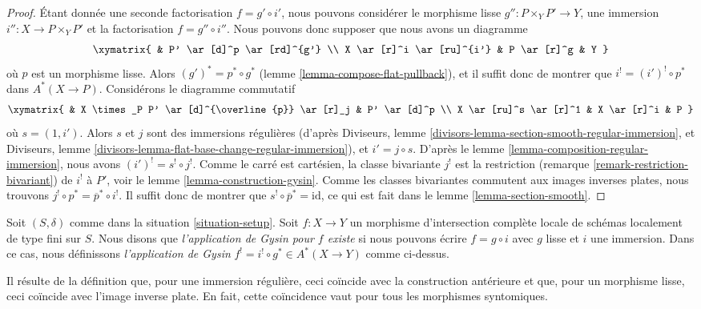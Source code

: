 \begin{proof}
Étant donnée une seconde factorisation $f = g' \circ i'$, nous pouvons
considérer le morphisme lisse $g'' : P \times_Y P' \to Y$, une
immersion $i'' : X \to P \times_Y P'$ et la factorisation
$f = g'' \circ i''$. Nous pouvons donc supposer que nous avons un diagramme
$$
\xymatrix{
& P' \ar[d]^p \ar[rd]^{g'} \\
X \ar[r]^i \ar[ru]^{i'} & P \ar[r]^g & Y
}
$$
où $p$ est un morphisme lisse. Alors $(g')^* = p^* \circ g^*$
(lemme \ref{lemma-compose-flat-pullback}), et il suffit donc
de montrer que $i^! = (i')^! \circ p^*$
dans $A^*(X \to P)$. Considérons le diagramme commutatif
$$
\xymatrix{
& X \times_P P' \ar[d]^{\overline{p}} \ar[r]_j & P' \ar[d]^p \\
X \ar[ru]^s \ar[r]^1 & X \ar[r]^i & P
}
$$
où $s =(1, i')$. Alors $s$ et $j$ sont des immersions régulières
(d'après Diviseurs, lemme \ref{divisors-lemma-section-smooth-regular-immersion},
et Diviseurs, lemme \ref{divisors-lemma-flat-base-change-regular-immersion}),
et $i' = j \circ s$. D'après le lemme \ref{lemma-composition-regular-immersion},
nous avons $(i')^! = s^! \circ j^!$.
Comme le carré est cartésien, la classe bivariante $j^!$
est la restriction (remarque \ref{remark-restriction-bivariant})
de $i^!$ à $P'$, voir le lemme \ref{lemma-construction-gysin}.
Comme les classes bivariantes commutent aux images inverses plates,
nous trouvons $j^! \circ p^* = \overline{p}^* \circ i^!$.
Il suffit donc de montrer que $s^! \circ \overline{p}^* = \text{id}$,
ce qui est fait dans le lemme \ref{lemma-section-smooth}.
\end{proof}

\begin{definition}
\label{definition-lci-gysin}
Soit $(S, \delta)$ comme dans la situation \ref{situation-setup}.
Soit $f : X \to Y$ un morphisme d'intersection complète locale
de schémas localement de type fini sur $S$. Nous disons que
{\it l'application de Gysin pour $f$ existe} si nous pouvons écrire
$f = g \circ i$ avec $g$ lisse et $i$ une immersion.
Dans ce cas, nous définissons
{\it l'application de Gysin} $f^! = i^! \circ g^* \in A^*(X \to Y)$ comme ci-dessus.
\end{definition}

\noindent
Il résulte de la définition que, pour une immersion régulière,
ceci coïncide avec la construction antérieure et que, pour un morphisme
lisse, ceci coïncide avec l'image inverse plate. En fait, cette coïncidence
vaut pour tous les morphismes syntomiques.

